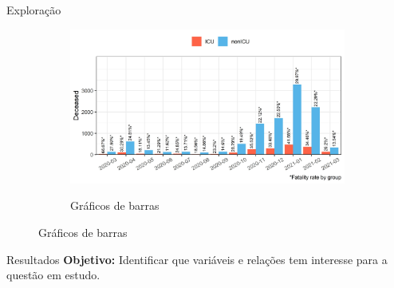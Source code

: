 \documentclass[pdf]
{beamer}
\begin{document}
\begin{frame}{Exploração}
\begin{figure}
\begin{subfigure}[][40pt][t]{0.3\textwidth}
		\caption*{Gráficos de barras}
		\vspace{-0.4cm}
   		 \includegraphics[width=\textwidth]{Imagens/histPlot_Discharge_month_Type_Death.jpeg}\\
	\end{subfigure}
\end{figure}
\end{frame}

\begin{frame}{Resultados}
\textbf{Objetivo:} Identificar que variáveis e relações tem interesse para a questão em estudo.

\end{frame}
\end{document}
